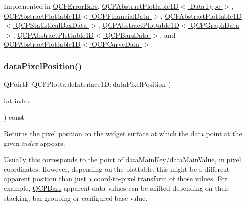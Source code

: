 Implemented in \hyperlink{class_q_c_p_error_bars_a88cd90280366b44c2159774bfb7c473a}{Q\+C\+P\+Error\+Bars}, \hyperlink{class_q_c_p_abstract_plottable1_d_a0f913bb0889ca7cb574657a078fc8cff}{Q\+C\+P\+Abstract\+Plottable1\+D$<$ Data\+Type $>$}, \hyperlink{class_q_c_p_abstract_plottable1_d_a0f913bb0889ca7cb574657a078fc8cff}{Q\+C\+P\+Abstract\+Plottable1\+D$<$ Q\+C\+P\+Financial\+Data $>$}, \hyperlink{class_q_c_p_abstract_plottable1_d_a0f913bb0889ca7cb574657a078fc8cff}{Q\+C\+P\+Abstract\+Plottable1\+D$<$ Q\+C\+P\+Statistical\+Box\+Data $>$}, \hyperlink{class_q_c_p_abstract_plottable1_d_a0f913bb0889ca7cb574657a078fc8cff}{Q\+C\+P\+Abstract\+Plottable1\+D$<$ Q\+C\+P\+Graph\+Data $>$}, \hyperlink{class_q_c_p_abstract_plottable1_d_a0f913bb0889ca7cb574657a078fc8cff}{Q\+C\+P\+Abstract\+Plottable1\+D$<$ Q\+C\+P\+Bars\+Data $>$}, and \hyperlink{class_q_c_p_abstract_plottable1_d_a0f913bb0889ca7cb574657a078fc8cff}{Q\+C\+P\+Abstract\+Plottable1\+D$<$ Q\+C\+P\+Curve\+Data $>$}.

\mbox{\label{class_q_c_p_plottable_interface1_d_a78911838cfbcfd2d8df9ad2fdbfb8e93}} 
\subsubsection{\texorpdfstring{data\+Pixel\+Position()}{dataPixelPosition()}}
{\footnotesize\ttfamily Q\+PointF Q\+C\+P\+Plottable\+Interface1\+D\+::data\+Pixel\+Position (\begin{DoxyParamCaption}\item[{int}]{index }\end{DoxyParamCaption}) const\hspace{0.3cm}{\ttfamily [pure virtual]}}

Returns the pixel position on the widget surface at which the data point at the given {\itshape index} appears.

Usually this corresponds to the point of \hyperlink{class_q_c_p_plottable_interface1_d_a2bd60daaac046945fead558cbd83cf73}{data\+Main\+Key}/\hyperlink{class_q_c_p_plottable_interface1_d_af6330919e8023277d08c958a6074fc76}{data\+Main\+Value}, in pixel coordinates. However, depending on the plottable, this might be a different apparent position than just a coord-\/to-\/pixel transform of those values. For example, \hyperlink{class_q_c_p_bars}{Q\+C\+P\+Bars} apparent data values can be shifted depending on their stacking, bar grouping or configured base value. 


